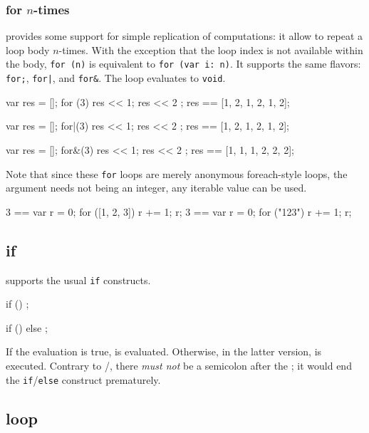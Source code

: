 \subsubsection{for $n$-times}
\label{sec:lang:for:n}

\us provides some support for simple replication of computations: it
allow to repeat a loop body $n$-times.  With the exception that the
loop index is not available within the body, \lstinline|for (n)| is
equivalent to \lstinline|for (var i: n)|.  It supports the same
flavors: \lstinline|for;|, \lstinline{for|}, and \lstinline|for&|. The
loop evaluates to \lstinline|void|.

\begin{urbiassert}
{ var res = []; for (3) { res << 1; res << 2 } ; res }
        == [1, 2, 1, 2, 1, 2];

{ var res = []; for|(3) { res << 1; res << 2 } ; res }
        == [1, 2, 1, 2, 1, 2];

{ var res = []; for&(3) { res << 1; res << 2 } ; res }
        == [1, 1, 1, 2, 2, 2];
\end{urbiassert}

Note that since these \lstinline|for| loops are merely anonymous
foreach-style loops, the argument needs not being an integer, any
iterable value can be used.

\begin{urbiassert}
3 == { var r = 0; for ([1, 2, 3]) r += 1; r};
3 == { var r = 0; for ("123")     r += 1; r};
\end{urbiassert}


\subsection{if}

\us supports the usual \lstinline|if| constructs.

\begin{urbiunchecked}
if ()
  ;

if ()
else
  ;
\end{urbiunchecked}

If the  evaluation is true,  is
evaluated. Otherwise, in the latter version,  is
executed.  Contrary to \C/\Cxx, there \emph{must not} be a semicolon
after the ; it would end the
\lstinline|if|/\lstinline|else| construct prematurely.

\subsection{loop}

